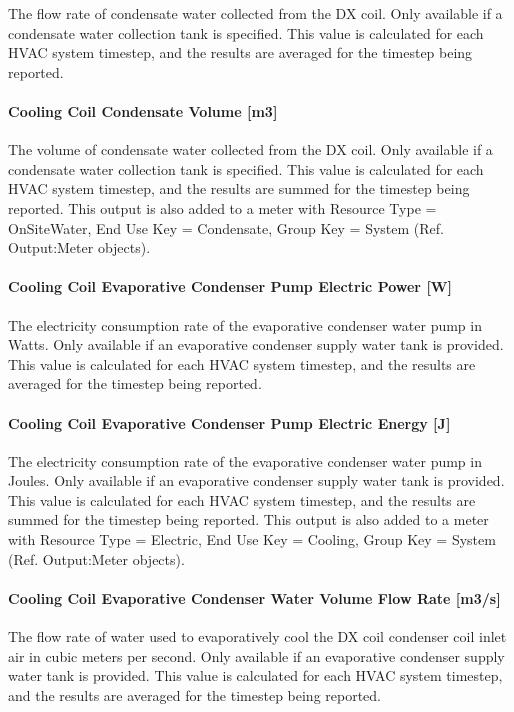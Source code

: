 The flow rate of condensate water collected from the DX coil. Only available if a condensate water collection tank is specified. This value is calculated for each HVAC system timestep, and the results are averaged for the timestep being reported.

\paragraph{Cooling Coil Condensate Volume {[}m3{]}}

The volume of condensate water collected from the DX coil. Only available if a condensate water collection tank is specified. This value is calculated for each HVAC system timestep, and the results are summed for the timestep being reported. This output is also added to a meter with Resource Type = OnSiteWater, End Use Key = Condensate, Group Key = System (Ref. Output:Meter objects).

\paragraph{Cooling Coil Evaporative Condenser Pump Electric Power {[}W{]}}

The electricity consumption rate of the evaporative condenser water pump in Watts. Only available if an evaporative condenser supply water tank is provided. This value is calculated for each HVAC system timestep, and the results are averaged for the timestep being reported.

\paragraph{Cooling Coil Evaporative Condenser Pump Electric Energy {[}J{]}}

The electricity consumption rate of the evaporative condenser water pump in Joules. Only available if an evaporative condenser supply water tank is provided. This value is calculated for each HVAC system timestep, and the results are summed for the timestep being reported. This output is also added to a meter with Resource Type = Electric, End Use Key = Cooling, Group Key = System (Ref. Output:Meter objects).

\paragraph{Cooling Coil Evaporative Condenser Water Volume Flow Rate {[}m3/s{]}}

The flow rate of water used to evaporatively cool the DX coil condenser coil inlet air in cubic meters per second. Only available if an evaporative condenser supply water tank is provided. This value is calculated for each HVAC system timestep, and the results are averaged for the timestep being reported.

